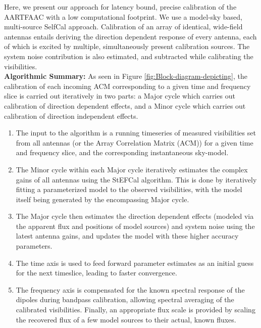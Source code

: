 \documentclass{aa}
\begin{document}
Here,  we present our  approach for  latency bound,  precise calibration  of the
AARTFAAC  with  a  low  computational  footprint.  We  use  a  model-sky  based,
multi-source  SelfCal approach\citep{wijnholds2009multisource}.   Calibration of
an  array  of identical,  wide-field  antennas  entails  deriving the  direction
dependent  response of  every antenna,  each of  which is  excited  by multiple,
simultaneously present  calibration sources.   The system noise  contribution is
also   estimated,   and   subtracted   while   calibrating   the   visibilities.\\
\textbf{Algorithmic        Summary:}       As        seen        in       Figure
\ref{fig:Block-diagram-depicting},  the   calibration  of  each   incoming  ACM
corresponding to a given time and  frequency slice is carried out iteratively in
two parts:  a Major cycle which  carries out calibration  of direction dependent
effects,  and  a  Minor  cycle   which  carries  out  calibration  of  direction
independent effects.
\begin {enumerate}
\item  {The  input  to  the  algorithm  is  a  running  timeseries  of  measured
  visibilities set from all antennas (or the Array Correlation Matrix (ACM)) for
  a  given  time  and  frequency  slice,  and  the  corresponding  instantaneous
  sky-model.}
\item {The Minor cycle within each Major cycle iteratively estimates the complex
  gains  of  all  antennas  using  the  StEFCal  algorithm.   This  is  done  by
  iteratively fitting  a parameterized model to the  observed visibilities, with
  the model itself being generated by the encompassing Major cycle.}
\item {The Major  cycle then estimates the direction  dependent effects (modeled
  via the apparent  flux and positions of model sources)  and system noise using
  the latest  antenna gains,  and updates the  model with these  higher accuracy
  parameters.}
\item {The time  axis is used to feed forward parameter  estimates as an initial
  guess for the next timeslice, leading to faster convergence.}
\item {The frequency axis is compensated for the known spectral response of the dipoles during bandpass calibration, allowing spectral averaging of the calibrated visibilities. Finally, an appropriate flux scale is provided by scaling the recovered flux of a few model sources to their actual, known fluxes.}
\end{enumerate}
\end{document}
